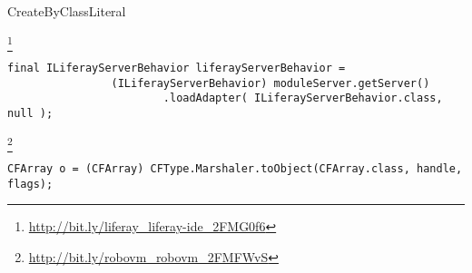 \begin{pattern}{CreateByClassLiteral}

\instances{}

\footnote{\url{http://bit.ly/liferay_liferay-ide_2FMG0f6}}

\begin{verbatim}
final ILiferayServerBehavior liferayServerBehavior =
                (ILiferayServerBehavior) moduleServer.getServer()
                        .loadAdapter( ILiferayServerBehavior.class, null );
\end{verbatim}

\footnote{\url{http://bit.ly/robovm_robovm_2FMFWvS}}

\begin{verbatim}
CFArray o = (CFArray) CFType.Marshaler.toObject(CFArray.class, handle, flags);
\end{verbatim}

\detection{}

\discussion{}

\related{}

\end{pattern}